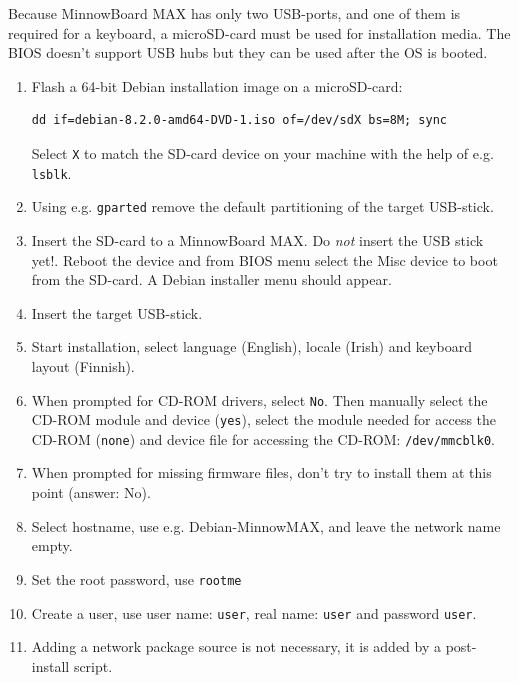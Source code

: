 \documentclass[a4paper,11pt]{article}
\newcommand{\cmd}[1]{\texttt{#1}}
\begin{document}
Because MinnowBoard MAX has only two USB-ports, and one of them is required for a keyboard, a microSD-card must be used for installation media. The BIOS doesn't support USB hubs but they can be used after the OS is booted.

\begin{enumerate}
\item Flash a 64-bit Debian installation image on a microSD-card:

\begin{lstlisting}
dd if=debian-8.2.0-amd64-DVD-1.iso of=/dev/sdX bs=8M; sync
\end{lstlisting}
Select \cmd{X} to match the SD-card device on your machine with the help of e.g. \cmd{lsblk}.

\item Using e.g. \cmd{gparted} remove the default partitioning of the target USB-stick.

\item Insert the SD-card to a MinnowBoard MAX. Do \emph{not} insert the USB stick yet!. Reboot the device and from BIOS menu select the Misc device to boot from the SD-card. A Debian installer menu should appear.

\item Insert the target USB-stick.

\item Start installation, select language (English), locale (Irish) and keyboard layout (Finnish).

\item When prompted for CD-ROM drivers, select \cmd{No}. Then manually select the CD-ROM module and device (\cmd{yes}), select the module needed for access the CD-ROM (\cmd{none}) and device file for accessing the CD-ROM: \cmd{/dev/mmcblk0}.

\item When prompted for missing firmware files, don't try to install them at this point (answer: No).

\item Select hostname, use e.g. Debian-MinnowMAX, and leave the network name empty.

\item Set the root password, use \cmd{rootme}

\item Create a user, use user name: \cmd{user}, real name: \cmd{user} and password \cmd{user}.

\item Adding a network package source is not necessary, it is added by a post-install script.


\end{enumerate}
\end{document}
